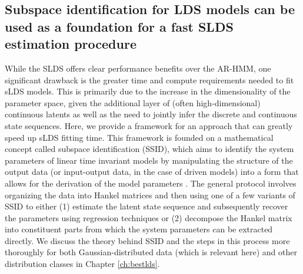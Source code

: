 \subsection{Subspace identification for LDS models can be used as a foundation for a fast SLDS estimation procedure}
\label{sec:slds:3.2.5}
While the SLDS offers clear performance benefits over the AR-HMM, one significant drawback is the greater time and compute requirements needed to fit sLDS models. This is primarily due to the increase in the dimensionality of the parameter space, given the additional layer of (often high-dimensional) continuous latents as well as the need to jointly infer the discrete and continuous state sequences. Here, we provide a framework for an approach that can greatly speed up sLDS fitting time. This framework is founded on a mathematical concept called subspace identification (SSID), which aims to identify the system parameters of linear time invariant models by manipulating the structure of the output data (or input-output data, in the case of driven models) into a form that allows for the derivation of the model parameters \cite{ho_editorial_1966, van_overschee_n4sid_1994, viberg_subspace-based_1995, van_overschee_subspace_1996}. The general protocol involves organizing the data into Hankel matrices \cite{widom_hankel_1966} and then using one of a few variants of SSID to either (1) estimate the latent state sequence and subsequently recover the parameters using regression techniques or (2) decompose the Hankel matrix into constituent parts from which the system parameters can be extracted directly. We discuss the theory behind SSID and the steps in this process more thoroughly for both Gaussian-distributed data (which is relevant here) and other distribution classes in Chapter \ref{ch:bestlds}. 

